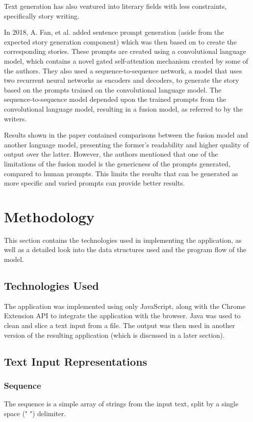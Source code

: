 \documentclass[journal]{./IEEE/IEEEtran}
\begin{document}
Text generation has also ventured into literary fields with less constraints, specifically story writing.

In 2018, A. Fan, et al. added sentence prompt generation (aside from the expected story generation component) which was then based on to create the corresponding stories. \cite{FLD2018} These prompts are created using a convolutional language model, which contains a novel gated self-attention mechanism created by some of the authors. \cite{DFAG2016}
They also used a sequence-to-sequence network, a model that uses two recurrent neural networks as encoders and decoders, to generate the story based on the prompts trained on the convolutional language model. The sequence-to-sequence model depended upon the trained prompts from the convolutional language model, resulting in a fusion model, as referred to by the writers.

Results shown in the paper contained comparisons between the fusion model and another language model,  presenting the former's readability and higher quality of output over the latter. However, the authors mentioned that one of the limitations of the fusion model is the genericness of the prompts generated, compared to human prompts. This limits the results that can be generated as more specific and varied prompts can provide better results.

\section {Methodology}
This section contains the technologies used in implementing the application, as well as a detailed look into the data structures used and the program flow of the model.

\subsection{Technologies Used}
The application was implemented using only JavaScript, along with the Chrome Extension API to integrate the application with the browser. Java was used to clean and slice a text input from a file. The output was then used in another version of the resulting application (which is discussed in a later section).

\subsection{Text Input Representations}
\subsubsection{Sequence}
The sequence is a simple array of strings from the input text, split by a single space (" ") delimiter.
\end{document}
